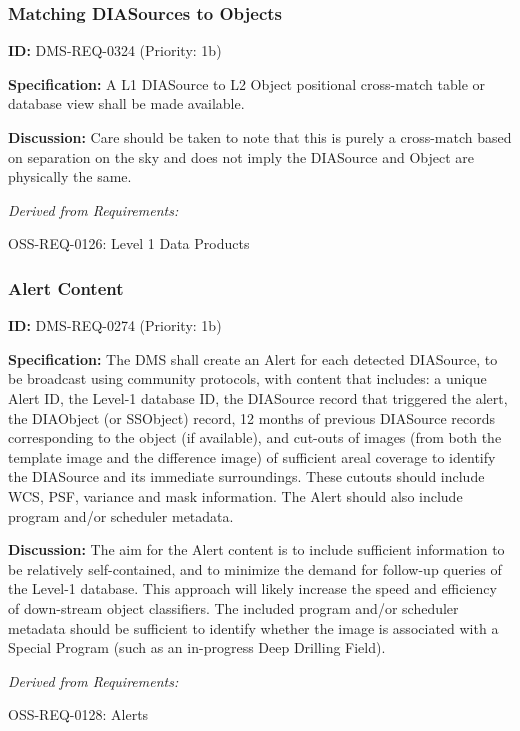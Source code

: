 \documentclass[SE,toc,lsstdraft]{lsstdoc}
\begin{document}
\subsubsection{Matching DIASources to Objects}

\label{DMS-REQ-0324}
\textbf{ID:} DMS-REQ-0324 (Priority: 1b)

\textbf{Specification:} A L1 DIASource to L2 Object positional cross-match table or database view shall be made available.

\textbf{Discussion:} Care should be taken to note that this is purely a cross-match based on separation on the sky and does not imply the DIASource and Object are physically the same.

\emph{Derived from Requirements:}

OSS-REQ-0126:
Level 1 Data Products \newline

\subsubsection{Alert Content}

\label{DMS-REQ-0274}
\textbf{ID:} DMS-REQ-0274 (Priority: 1b)

\textbf{Specification:}
    The DMS shall create an Alert for each detected DIASource, to be broadcast using community protocols, with content that includes: a unique Alert ID, the Level-1 database ID, the DIASource record that triggered the alert, the DIAObject (or SSObject) record, 12 months of previous DIASource records corresponding to the object (if available), and cut-outs of images (from both the template image and the difference image) of sufficient areal coverage to identify the DIASource and its immediate surroundings. These cutouts should include WCS, PSF, variance and mask information. The Alert should also include program and/or scheduler metadata.

\textbf{Discussion:}
    The aim for the Alert content is to include sufficient information to be relatively self-contained, and to minimize the demand for follow-up queries of the Level-1 database. This approach will likely increase the speed and efficiency of down-stream object classifiers. The included program and/or scheduler metadata should be sufficient to identify whether the image is associated with a Special Program (such as an in-progress Deep Drilling Field).

\emph{Derived from Requirements:}

OSS-REQ-0128:
Alerts \newline
\end{document}
